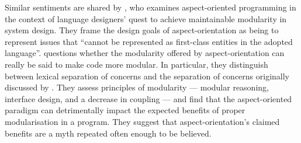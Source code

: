 Similar sentiments are shared by \citet{przybylek2010wrong}, who examines
aspect-oriented programming in the context of language designers' quest to
achieve maintainable modularity in system design. They frame the design goals of
aspect-orientation as being to represent issues that ``cannot be represented as
first-class entities in the adopted language''. \citeauthor{przybylek2010wrong}
questions whether the modularity offered by aspect-orientation can really be
said to make code more modular. In particular, they distinguish between lexical
separation of concerns and the separation of concerns originally discussed by
\citet{djikstra_scientific_thought}. They assess principles of modularity ---
modular reasoning, interface design, and a decrease in coupling --- and find
that the aspect-oriented paradigm can detrimentally impact the expected benefits
of proper modularisation in a program.
They suggest that aspect-orientation's claimed benefits are a myth repeated
often enough to be believed.







